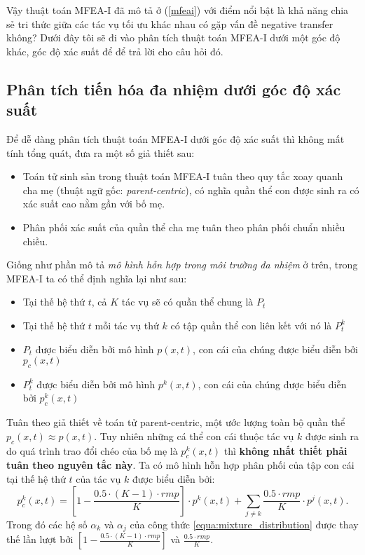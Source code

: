 Vậy thuật toán MFEA-I đã mô tả ở (\ref{mfeai}) với điểm nổi bật là khả năng chia sẻ tri thức giữa các tác vụ tối ưu khác nhau có gặp vấn đề negative transfer không? Dưới đây tôi sẽ đi vào phân tích thuật toán MFEA-I dưới một góc độ khác, góc độ xác suất để để trả lời cho câu hỏi đó.

\subsection{Phân tích tiến hóa đa nhiệm dưới góc độ xác suất}
Để dễ dàng phân tích thuật toán MFEA-I dưới góc độ xác suất thì không mất tính tổng quát, đưa ra một số giả thiết sau:
\begin{itemize}
    \item Toán tử sinh sản trong thuật toán MFEA-I tuân theo quy tắc xoay quanh cha mẹ (thuật ngữ gốc: \emph{parent-centric}), có nghĩa quần thể con được sinh ra có xác suất cao nằm gần với bố mẹ. 
    \item Phân phối xác suất của quần thể cha mẹ tuân theo phân phối chuẩn nhiều chiều.
\end{itemize}
Giống như phần mô tả \emph{mô hình hỗn hợp trong môi trường đa nhiệm} ở trên, trong MFEA-I ta có thể định nghĩa lại như sau:
\begin{itemize}
    \item Tại thế hệ thứ $t$, cả $K$ tác vụ sẽ có quần thể chung là $P_t$
    \item Tại thế hệ thứ $t$ mỗi tác vụ thứ $k$ có tập quần thể con liên kết với nó là $P_t^k$
    \item $P_t$ được biểu diễn bởi mô hình $p(x,t)$, con cái của chúng được biểu diễn bởi $p_c(x,t)$
    \item $P_t^k$ được biểu diễn bởi mô hình $p^k(x,t)$, con cái của chúng được biểu diễn bởi $p_c^k(x,t)$
\end{itemize}
Tuân theo giả thiết về toán tử parent-centric, một ước lượng toàn bộ quần thể $p_c(x,t) \approx p(x,t)$. Tuy nhiên những cá thể con cái thuộc tác vụ $k$ được sinh ra do quá trình trao đổi chéo của bố mẹ là $p_c^k(x,t)$ thì \textbf{không nhất thiết phải tuân theo nguyên tắc này}.
Ta có mô hình hỗn hợp phân phối của tập con cái tại thế hệ thứ $t$ của tác vụ $k$ được biểu diễn bởi:
\begin{equation}
    p_c^k(x,t) = [1 - \frac{0.5 \cdot (K - 1) \cdot rmp}{K} ] \cdot p^k(x,t) + \sum_{j \neq k}\frac{0.5 \cdot rmp}{K} \cdot p^j(x,t).
    \label{equa:mfea_offstring_distribution}
\end{equation}
Trong đó các hệ số $\alpha_k$ và $\alpha_j$ của công thức \ref{equa:mixture_distribution} được thay thế lần lượt bởi $[1 - \frac{0.5 \cdot (K - 1) \cdot rmp}{K} ] $ và $\frac{0.5 \cdot rmp}{K}$. 


